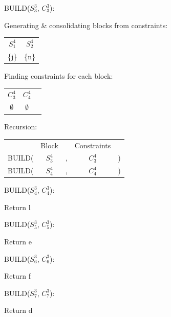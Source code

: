 \documentclass[11pt]{article} %
\begin{document}
	\hspace{0.5cm}BUILD($S_3^3$, $C_3^3$):
		\begin{center}
		Generating \& consolidating blocks from constraints:
		
		\begin{tabular}{c c}
			\hspace{0.8cm}$S_1^4$\hspace{0.8cm} & \hspace{0.8cm}$S_2^4$\hspace{0.8cm} \\
			\{j\} & \{n\}
		\end{tabular}
	
		Finding constraints for each block:
		
		\begin{tabular}{c c c}
			\hspace{0.8cm}$C_3^4$\hspace{0.8cm} & \hspace{0.8cm}$C_4^4$\hspace{0.8cm} \\
			$\emptyset$ & $\emptyset$
		\end{tabular}

		Recursion:
		
		\begin{tabular}{c c c c c}
			 & Block & & Constraints & \\
			BUILD( & $S_3^4$ & , & $C_3^4$ & ) \\
			BUILD( & $S_4^4$ & , & $C_4^4$ & )
		\end{tabular}
		\end{center}

	\hspace{0.5cm}BUILD($S_4^3$, $C_4^3$):
		\begin{center}
		Return l
		\end{center}

	\hspace{0.5cm}BUILD($S_5^3$, $C_5^3$):
		\begin{center}
		Return e
		\end{center}

	\hspace{0.5cm}BUILD($S_6^3$, $C_6^3$):
		\begin{center}
		Return f
		\end{center}

	\hspace{0.5cm}BUILD($S_7^3$, $C_7^3$):
		\begin{center}
		Return d
		\end{center}
\end{document}
